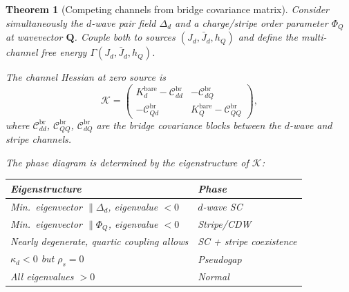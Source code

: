 \documentclass[12pt]{article}
\theoremstyle{plain}
\newtheorem{theorem}{Theorem}[section]
\theoremstyle{definition}
\numberwithin{equation}{section}
\newcommand{\br}{\mathrm{br}}
\begin{document}
\begin{theorem}[Competing channels from bridge covariance matrix]\label{thm:competing}
Consider simultaneously the $d$-wave pair field $\Delta_d$ and a
charge/stripe order parameter $\Phi_Q$ at wavevector $\bm{Q}$.
Couple both to sources $(J_d,\bar{J}_d,h_Q)$ and define the
multi-channel free energy $\Gamma(J_d,\bar{J}_d,h_Q)$.

The channel Hessian at zero source is
\begin{equation}\label{eq:channelH}
\boxed{\mathcal{K} = \begin{pmatrix}
K_d^{\mathrm{bare}}-\mathcal{C}_{dd}^{\br}
& -\mathcal{C}_{dQ}^{\br}\\
-\mathcal{C}_{Qd}^{\br}
& K_Q^{\mathrm{bare}}-\mathcal{C}_{QQ}^{\br}
\end{pmatrix},}
\end{equation}
where $\mathcal{C}_{dd}^{\br}$, $\mathcal{C}_{QQ}^{\br}$,
$\mathcal{C}_{dQ}^{\br}$ are the bridge covariance blocks
between the $d$-wave and stripe channels.

The phase diagram is determined by the eigenstructure of
$\mathcal{K}$:
\begin{center}
\begin{tabular}{ll}
\toprule
Eigenstructure & Phase\\
\midrule
Min.\ eigenvector $\parallel\Delta_d$, eigenvalue $<0$ & $d$-wave SC\\
Min.\ eigenvector $\parallel\Phi_Q$, eigenvalue $<0$ & Stripe/CDW\\
Nearly degenerate, quartic coupling allows & SC + stripe coexistence\\
$\kappa_d<0$ but $\rho_s=0$ & Pseudogap\\
All eigenvalues $>0$ & Normal\\
\bottomrule
\end{tabular}
\end{center}
\end{theorem}
\end{document}

